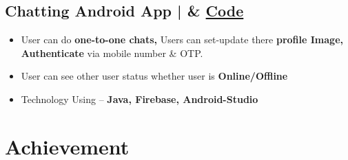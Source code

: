 \documentclass[a4,11pt]{article}
\newenvironment{zitemize}{
\begin{itemize}\itemsep0pt \parskip0pt \parsep1pt}
{\end{itemize}\vspace{-0.5cm}}
\begin{document}
\subsection{\large Chatting Android App | \faGithub & \normalfont \href{https://github.com/akhilsharmaa/Whatsapp-ChatApp}{Code}
\hfill{}}
    \begin{zitemize}
        \item User can do \textbf{one-to-one chats,} Users can set-update there \textbf{profile Image, Authenticate} via mobile number \& OTP.
        \item User can see other user status whether user is \textbf{Online/Offline}
        \item Technology Using – \textbf{ Java, Firebase, Android-Studio}
    \end{zitemize}









\section{Achievement}
\vspace{0.1cm}
\end{document}
